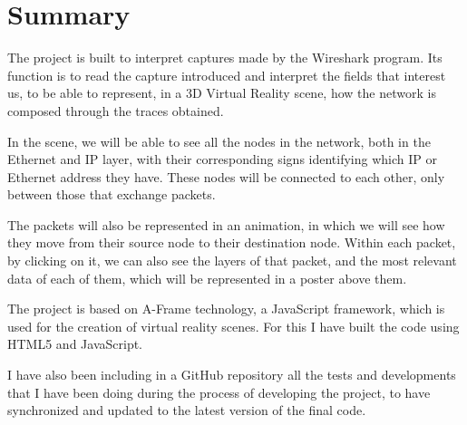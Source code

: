 \documentclass[a4paper, 12pt]{book}
\begin{document}

\chapter*{Summary}

The project is built to interpret captures made by the Wireshark program. Its function is to read the capture introduced and interpret the fields that interest us, to be able to represent, in a 3D Virtual Reality scene, how the network is composed through the traces obtained.

In the scene, we will be able to see all the nodes in the network, both in the Ethernet and IP layer, with their corresponding signs identifying which IP or Ethernet address they have.
These nodes will be connected to each other, only between those that exchange packets.

The packets will also be represented in an animation, in which we will see how they move from their source node to their destination node. Within each packet, by clicking on it, we can also see the layers of that packet, and the most relevant data of each of them, which will be represented in a poster above them.

The project is based on A-Frame technology, a JavaScript framework, which is used for the creation of virtual reality scenes. For this I have built the code using HTML5 and JavaScript.

I have also been including in a GitHub repository all the tests and developments that I have been doing during the process of developing the project, to have synchronized and updated to the latest version of the final code.




\tableofcontents 
\cleardoublepage
\end{document}
